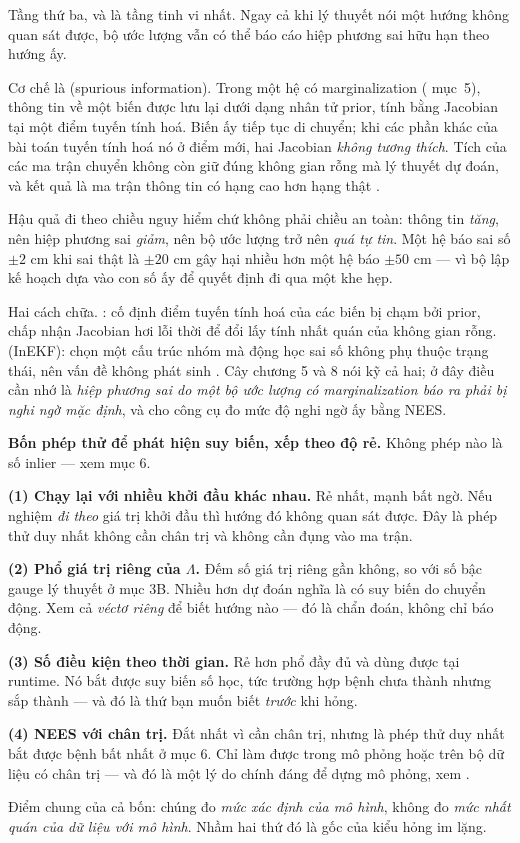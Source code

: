 \documentclass[../../vslam.tex]{subfiles}
\begin{document}
Tầng thứ ba, và là tầng tinh vi nhất. Ngay cả khi lý thuyết nói một hướng không quan sát được, bộ ước lượng vẫn có thể báo cáo hiệp phương sai hữu hạn theo hướng ấy.

Cơ chế là  (spurious information). Trong một hệ có marginalization ( mục~5), thông tin về một biến được lưu lại dưới dạng nhân tử prior, tính bằng Jacobian tại một điểm tuyến tính hoá. Biến ấy tiếp tục di chuyển; khi các phần khác của bài toán tuyến tính hoá nó ở điểm mới, hai Jacobian \emph{không tương thích}. Tích của các ma trận chuyển không còn giữ đúng không gian rỗng mà lý thuyết dự đoán, và kết quả là ma trận thông tin có hạng cao hơn hạng thật \cite{huang2008fej}.

Hậu quả đi theo chiều nguy hiểm chứ không phải chiều an toàn: thông tin \emph{tăng}, nên hiệp phương sai \emph{giảm}, nên bộ ước lượng trở nên \emph{quá tự tin}. Một hệ báo sai số \(\pm 2\) cm khi sai thật là \(\pm 20\) cm gây hại nhiều hơn một hệ báo \(\pm 50\) cm --- vì bộ lập kế hoạch dựa vào con số ấy để quyết định đi qua một khe hẹp.

Hai cách chữa. : cố định điểm tuyến tính hoá của các biến bị chạm bởi prior, chấp nhận Jacobian hơi lỗi thời để đổi lấy tính nhất quán của không gian rỗng.  (InEKF): chọn một cấu trúc nhóm mà động học sai số không phụ thuộc trạng thái, nên vấn đề không phát sinh \cite{barrau2017invariant}. Cây  chương 5 và 8 nói kỹ cả hai; ở đây điều cần nhớ là \emph{hiệp phương sai do một bộ ước lượng có marginalization báo ra phải bị nghi ngờ mặc định}, và  cho công cụ đo mức độ nghi ngờ ấy bằng NEES.

\begin{cambay}
\textbf{Bốn phép thử để phát hiện suy biến, xếp theo độ rẻ.} Không phép nào là số inlier --- xem  mục 6.

\textbf{(1) Chạy lại với nhiều khởi đầu khác nhau.} Rẻ nhất, mạnh bất ngờ. Nếu nghiệm \emph{đi theo} giá trị khởi đầu thì hướng đó không quan sát được. Đây là phép thử duy nhất không cần chân trị và không cần đụng vào ma trận.

\textbf{(2) Phổ giá trị riêng của \(\Lambda\).} Đếm số giá trị riêng gần không, so với số bậc gauge lý thuyết ở mục 3B. Nhiều hơn dự đoán nghĩa là có suy biến do chuyển động. Xem cả \emph{véctơ riêng} để biết hướng nào --- đó là chẩn đoán, không chỉ báo động.

\textbf{(3) Số điều kiện theo thời gian.} Rẻ hơn phổ đầy đủ và dùng được tại runtime. Nó bắt được suy biến số học, tức trường hợp bệnh chưa thành nhưng sắp thành --- và đó là thứ bạn muốn biết \emph{trước} khi hỏng.

\textbf{(4) NEES với chân trị.} Đắt nhất vì cần chân trị, nhưng là phép thử duy nhất bắt được bệnh bất nhất ở mục 6. Chỉ làm được trong mô phỏng hoặc trên bộ dữ liệu có chân trị --- và đó là một lý do chính đáng để dựng mô phỏng, xem .

Điểm chung của cả bốn: chúng đo \emph{mức xác định của mô hình}, không đo \emph{mức nhất quán của dữ liệu với mô hình}. Nhầm hai thứ đó là gốc của kiểu hỏng im lặng.
\end{cambay}
\end{document}
